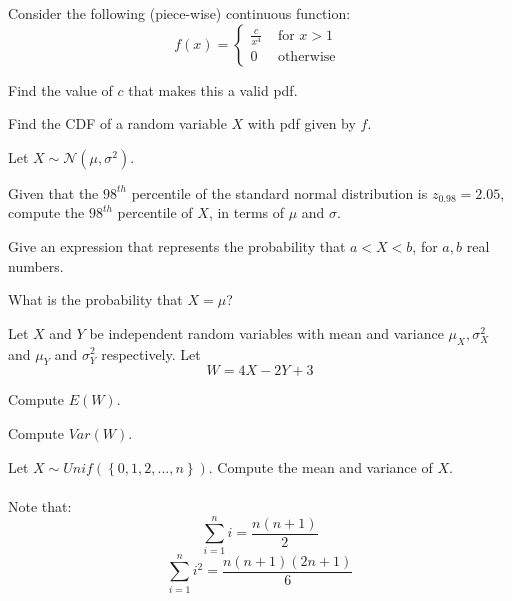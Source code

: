 \documentclass{article}
\begin{document}
\begin{problem}{20}
Consider the following (piece-wise) continuous function:
$$f(x) = \left\{
\begin{matrix}
 \frac{c}{x^4}& \textrm{ for } x>1\\
  0 &\textrm{ otherwise }
\end{matrix}\right.$$
\vspace{1pc}

Find the value of $c$ that makes this a valid pdf.
\vspace{1pc}

Find the CDF of a random variable $X$ with pdf given by $f$.
\end{problem}

\begin{problem}{20}
Let $X \sim \mathcal{N}(\mu,\sigma^2)$.  
\vspace{1pc}

Given that the $98^{th}$ percentile of the standard normal distribution is $z_{0.98} = 2.05$, compute the $98^{th}$ percentile of $X$, in terms of $\mu$ and $\sigma$.
\vspace{1pc}

Give an expression that represents the probability that $a<X<b$, for $a,b$ real numbers.
\vspace{1pc}

What is the probability that $X=\mu$?
\end{problem}
\vspace{1pc}

\begin{problem}{12}
Let $X$ and $Y$ be independent random variables with mean and variance $\mu_X,\sigma_X^2$ and $\mu_Y$ and $\sigma_Y^2$ respectively. Let
$$W= 4X-2Y +3$$
\vspace{1pc}

Compute $E(W)$.
\vspace{1pc}

Compute $Var(W)$.

\end{problem}

\begin{problem}{20}
Let $X \sim Unif(\left\{0,1,2,...,n\right\})$. Compute the mean and variance of $X$. \\\\

Note that:
$$\sum_{i=1}^n i = \frac{n(n+1)}2$$
$$\sum_{i=1}^n i^2 = \frac{n(n+1)(2n+1)}6$$

\end{problem}
\end{document}
